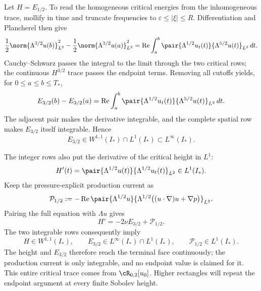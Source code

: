 Let \(H=E_{1/2}\).  To read the homogeneous critical energies from the
inhomogeneous trace, mollify in time and truncate frequencies to
\(\varepsilon\leq|\xi|\leq R\).  Differentiation and Plancherel then give
\[
  \frac{1}{2}\norm{\Lambda^{3/2}u(b)}_{L^2}^{2}
  -\frac{1}{2}\norm{\Lambda^{3/2}u(a)}_{L^2}^{2}
  =
  \operatorname{Re}\int_a^b
  \pair{\Lambda^{1/2}u_t(t)}{\Lambda^{5/2}u(t)}_{L^2}
  \,dt.
\]
Cauchy--Schwarz passes the integral to the limit through the two critical rows;
the continuous \(H^{3/2}\) trace passes the endpoint terms.  Removing all
cutoffs yields, for \(0\leq a\leq b\leq T_*\),
\[
  E_{3/2}(b)-E_{3/2}(a)
  =
  \operatorname{Re}\int_a^b
  \pair{\Lambda^{1/2}u_t(t)}{\Lambda^{5/2}u(t)}_{L^2}
  \,dt.
\]
The adjacent pair makes the derivative integrable, and the complete spatial row
makes \(E_{3/2}\) itself integrable.  Hence
\begin{equation}\label{eq:SectionThreeCriticalEnergyRegularity}
  E_{3/2}\in W^{1,1}(I_*)\cap L^1(I_*)
  \subset L^\infty(I_*).
\end{equation}

The integer rows also put the derivative of the critical height in \(L^1\):
\begin{equation}\label{eq:SectionThreeCriticalHeightDerivative}
  H'(t)
  =\pair{\Lambda^{1/2}u(t)}{\Lambda^{1/2}u_t(t)}_{L^2}
  \in L^1(I_*).
\end{equation}
Keep the pressure-explicit production current as
\[
  \mathcal P_{1/2}
  :=
  -\operatorname{Re}
  \pair{\Lambda^{1/2}u}
  {\Lambda^{1/2}\bigl((u\cdot\nabla)u+\nabla p\bigr)}_{L^2}.
\]
Pairing the full equation with \(\Lambda u\) gives
\[
  H'=-2\nu E_{3/2}+\mathcal P_{1/2}.
\]
The two integrable rows consequently imply
\[
  H\in W^{1,1}(I_*),
  \qquad
  E_{3/2}\in L^\infty(I_*)\cap L^1(I_*),
  \qquad
  \mathcal P_{1/2}\in L^1(I_*).
\]
The height and \(E_{3/2}\) therefore reach the terminal face continuously; the
production current is only integrable, and no endpoint value is claimed for it.
This entire critical trace comes from \(\cR_{0,2}[u_0]\).  Higher rectangles
will repeat the endpoint argument at every finite Sobolev height.

